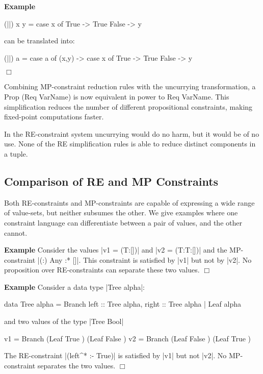 \documentclass[preprint]{sigplanconf}
\newcommand{\C}[1]{\textsf{#1}}
\newcounter{exmp}
\newcommand{\yesexample}{\addtocounter{exmp}{1}\addvspace{2mm}\noindent\textbf{Example \arabic{exmp}}}
\newcommand{\noexample}{\hfill$\Box$\par\addvspace{2mm}}
\newenvironment{example}{\yesexample}{\noexample}
\begin{document}
\begin{example}
\begin{code}
(||) x y = case  x of
                 True   -> True
                 False  -> y
\end{code}

\noindent can be translated into:

\begin{code}
(||) a = case  a of
               (x,y) -> case  x of
                              True    -> True
                              False   -> y
\end{code}
\end{example}

Combining MP-constraint reduction rules with the uncurrying transformation, a \C{Prop (Req VarName)} is now equivalent in power to \C{Req VarName}. This simplification reduces the number of different propositional constraints, making fixed-point computations faster.

In the RE-constraint system uncurrying would do no harm, but it would be of no use. None of the RE simplification rules is able to reduce distinct components in a tuple.

\subsection{Comparison of RE and MP Constraints}

Both RE-constraints and MP-constraints are capable of expressing a wide range of value-sets, but neither subsumes the other. We give examples where one constraint language can differentiate between a pair of values, and the other cannot.

\begin{example}
Consider the values |v1 = (T:[])| and |v2 = (T:T:[])| and the MP-constraint |{(:) Any} :* {[]}|. This constraint is satisfied by |v1| but not by |v2|. No proposition over RE-constraints can separate these two values.
\end{example}

\begin{example}
Consider a data type |Tree alpha|:

\begin{code}
data Tree alpha  =  Branch {left :: Tree alpha, right :: Tree alpha}
                 |  Leaf alpha
\end{code}

\noindent and two values of the type |Tree Bool|

\begin{code}
v1 = Branch (Leaf True   ) (Leaf False  )
v2 = Branch (Leaf False  ) (Leaf True   )
\end{code}

\noindent The RE-constraint |(left^* :- True)| is satisfied by |v1| but not |v2|. No MP-constraint separates the two values.
\end{example}
\end{document}
